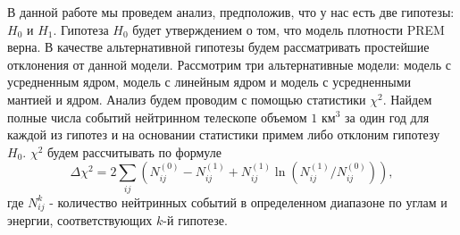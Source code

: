 В данной работе мы проведем анализ, предположив, что у нас есть две гипотезы: $H_0$ и $H_1$. Гипотеза $H_0$ будет утверждением о том, что модель плотности PREM верна. В качестве альтернативной гипотезы будем рассматривать простейшие отклонения от данной модели.   
Рассмотрим три альтернативные модели: модель с усредненным ядром, модель с линейным ядром и модель с усредненными мантией и ядром. Анализ будем проводим с помощью статистики $\chi^2$. Найдем полные числа событий нейтринном телескопе объемом $1\text{ км}^3$ за один год для каждой из гипотез и на основании статистики примем либо отклоним гипотезу $H_0$. $\chi^2$ будем рассчитывать по формуле 
\begin{equation}
    \Delta\chi^2 = 2\sum\limits_{ij}(N_{ij}^{(0)} - N_{ij}^{(1)}+N_{ij}^{(1)}\ln(N_{ij}^{(1)}/N_{ij}^{(0)})),
\end{equation}
где $N^{k}_{ij}$ - количество нейтринных событий в определенном диапазоне по углам и энергии, соответствующих $k$-й гипотезе. 
